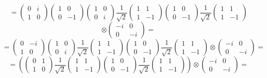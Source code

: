 \documentclass[12pt]{article}
\begin{document}
$$=\begin{pmatrix} 0 & i \\ 1 & 0 \end{pmatrix} \begin{pmatrix} 1 & 0 \\ 0 & -1\end{pmatrix}\begin{pmatrix} 1 & 0 \\ 0 & i\end{pmatrix}\frac{1}{\sqrt{2}}\begin{pmatrix} 1 & 1\\ 1 &-1\end{pmatrix}\begin{pmatrix} 1 & 0 \\ 0 & -1\end{pmatrix}
\frac{1}{\sqrt{2}}\begin{pmatrix} 1 & 1\\ 1 &-1\end{pmatrix}$$
$$ \otimes\begin{pmatrix} -i & 0 \\ 0& -i\end{pmatrix}  = 
$$
$$=\begin{pmatrix} 0 & -i\\ 1 & 0\end{pmatrix}\begin{pmatrix} 1 & 0 \\ 0 & i\end{pmatrix}\frac{1}{\sqrt{2}}\begin{pmatrix} 1 & 1\\ 1 &-1\end{pmatrix}\begin{pmatrix} 1 & 0 \\ 0 & -1\end{pmatrix}
\frac{1}{\sqrt{2}}\begin{pmatrix} 1 & 1\\ 1 &-1\end{pmatrix}
 \otimes\begin{pmatrix} -i & 0 \\ 0& -i\end{pmatrix}  = 
$$
$$=\left(\begin{pmatrix} 0 & 1 \\ 1 & 0\end{pmatrix}\frac{1}{\sqrt{2}}\begin{pmatrix} 1 & 1\\ 1 &-1\end{pmatrix}\begin{pmatrix} 1 & 0 \\ 0 & -1\end{pmatrix}
\frac{1}{\sqrt{2}}\begin{pmatrix} 1 & 1\\ 1 &-1\end{pmatrix}\right)
 \otimes\begin{pmatrix} -i & 0 \\ 0& -i\end{pmatrix}  = 
$$
\end{document}
